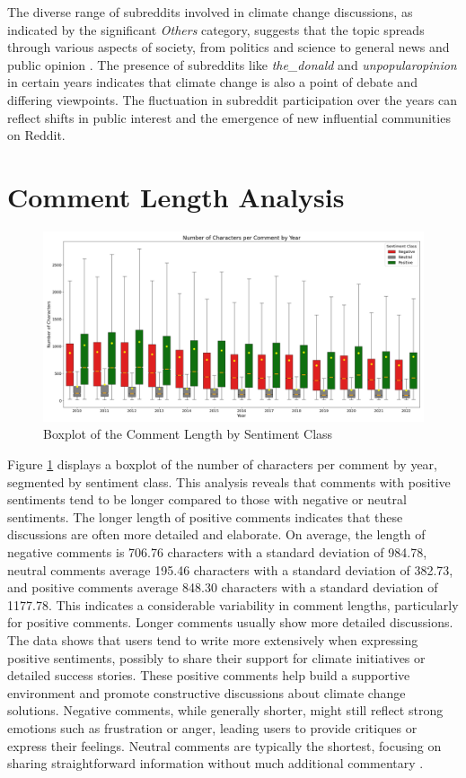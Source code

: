 The diverse range of subreddits involved in climate change discussions, as indicated by the significant \emph{Others} category, suggests that the topic spreads through various aspects of society, from politics and science to general news and public opinion \cite{doi:10.1177/1329878X211038004}. The presence of subreddits like \emph{the\_donald} and \emph{unpopularopinion} in certain years indicates that climate change is also a point of debate and differing viewpoints. The fluctuation in subreddit participation over the years can reflect shifts in public interest and the emergence of new influential communities on Reddit.

\section{Comment Length Analysis}
\begin{figure}[h]
    \includegraphics[width=\textwidth]{images/overview/comment_length_boxplot.png}
    \caption{Boxplot of the Comment Length by Sentiment Class}
    \label{fig:boxplot_comment_length}
\end{figure}
Figure \ref{fig:boxplot_comment_length} displays a boxplot of the number of characters per comment by year, segmented by sentiment class. This analysis reveals that comments with positive sentiments tend to be longer compared to those with negative or neutral sentiments. The longer length of positive comments indicates that these discussions are often more detailed and elaborate. On average, the length of negative comments is 706.76 characters with a standard deviation of 984.78, neutral comments average 195.46 characters with a standard deviation of 382.73, and positive comments average 848.30 characters with a standard deviation of 1177.78. This indicates a considerable variability in comment lengths, particularly for positive comments.
Longer comments usually show more detailed discussions. The data shows that users tend to write more extensively when expressing positive sentiments, possibly to share their support for climate initiatives or detailed success stories. These positive comments help build a supportive environment and promote constructive discussions about climate change solutions. Negative comments, while generally shorter, might still reflect strong emotions such as frustration or anger, leading users to provide critiques or express their feelings. Neutral comments are typically the shortest, focusing on sharing straightforward information without much additional commentary \cite{orglearning}.
